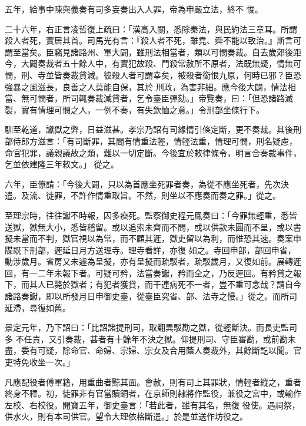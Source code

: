 \begin{pinyinscope}
 五年，給事中陳與義奏有司多妄奏出入人罪，帝為申嚴立法，終不
 悛。



 二十六年，右正言凌哲復上疏曰：「漢高入關，悉除秦法，與民約法三章耳。所謂殺人者死，實居其首。司馬光有言：『殺人者不死，雖堯、舜不能以致治。』斯言可謂至當矣。臣竊見諸路州、軍大闢，雖刑法相當者，類以可憫奏裁。自去歲郊後距今，大闢奏裁者五十餘人中，有實犯故殺、鬥殺常赦所不原者，法既無疑，情無可憫，刑、寺並皆奏裁貸減。彼殺人者可謂幸矣，被殺者銜恨九原，何時已邪？臣恐強暴之風滋長，良善之人莫能自保，其於
 刑政，為害非細。應今後大闢，情法相當、無可憫者，所司輒奏裁減貸者，乞令臺臣彈劾。」帝覽奏，曰：「但恐諸路滅裂，實有情理可憫之人，一例不奏，有失欽恤之意。」令刑部坐條行下。



 馴至乾道，讞獄之弊，日益滋甚。孝宗乃詔有司緣情引條定斷，更不奏裁。其後刑部侍郎方滋言：「有司斷罪，其間有情重法輕，情輕法重，情理可憫，刑名疑慮，命官犯罪，議親議故之類，難以一切定斷。今後宜於敕律條令，明言合奏裁事件，乞並依建隆三年敕文。」
 從之。



 六年，臣僚請：「今後大闢，只以為首應坐死罪者奏，為從不應坐死者，先次決遣。及流、徒罪，不許作情重取旨。不然，則坐以不應奏而奏之罪。」從之。



 至理宗時，往往讞不時報，囚多瘐死。監察御史程元鳳奏曰：「今罪無輕重，悉皆送獄，獄無大小，悉皆稽留。或以追索未齊而不問，或以供款未圓而不呈，或以書擬未當而不判，獄官視以為常，而不顧其遲，獄吏留以為利，而惟恐其速。奏案申牒既下刑部，遲延日月方送理寺。理寺看詳，亦復
 如之。寺回申部，部回申省，動涉歲月。省房又未遽為呈擬，亦有呈擬而疏駁者，疏駁歲月，又復如前。展轉遲回，有一二年未報下者。可疑可矜，法當奏讞，矜而全之，乃反遲回。有矜貸之報下，而其人已斃於獄者；有犯者獲貸，而干連病死不一者，豈不重可念哉？請自今諸路奏讞，即以所發月日申御史臺，從臺臣究省、部、法寺之慢。」從之。而所司延滯，尋復如舊。



 景定元年，乃下詔曰：「比詔諸提刑司，取翻異駁勘之獄，從輕斷決。而長吏監司多
 不任責，又引奏裁，甚者有十餘年不決之獄。仰提刑司、守臣審勘，或前勘未盡，委有可疑，除命官、命婦、宗婦、宗女及合用蔭人奏裁外，其餘斷訖以聞。官吏特免收坐一次。」



 凡應配役者傅軍籍，用重曲者黥其面。會赦，則有司上其罪狀，情輕者縱之，重者終身不釋。初，徒罪非有官當贖銅者，在京師則隸將作監役，兼役之宮中，或輸作左校、右校役。開寶五年，御史臺言：「若此者，雖有其名，無復
 役使。遇祠祭，供水火，則有本司供官。望令大理依格斷遣。」於是並送作坊役之。




\end{pinyinscope}
